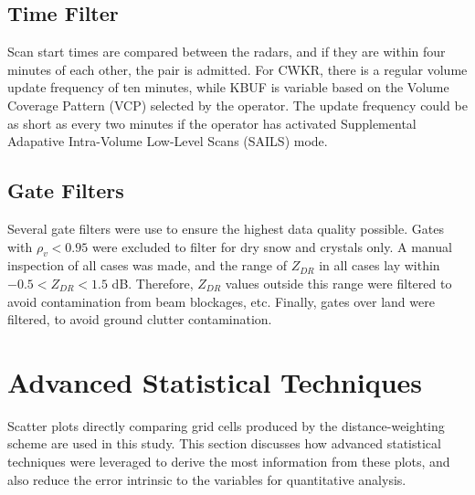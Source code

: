 \subsection{Time Filter}
Scan start times are compared between the radars, and if they are within four minutes of each other, the pair is admitted. For CWKR, there is a regular
volume update frequency of ten minutes, while KBUF is variable based on the Volume Coverage Pattern (VCP) selected by the operator. The update frequency
could be as short as every two minutes if the operator has activated Supplemental Adapative Intra-Volume Low-Level Scans (SAILS) mode.
\subsection{Gate Filters}
Several gate filters were use to ensure the highest data quality possible. Gates with $\rho_{v} < 0.95$ were excluded to filter for dry snow and crystals
only. A manual inspection of all cases was made, and the range of $Z_{DR}$ in all cases lay within $-0.5 < Z_{DR} < 1.5$ dB. Therefore, $Z_{DR}$ values
outside this range were filtered to avoid contamination from beam blockages, etc. Finally, gates over land were filtered, to avoid ground clutter
contamination.
\section{Advanced Statistical Techniques}
Scatter plots directly comparing grid cells produced by the distance-weighting scheme are used in this study. This section discusses how advanced statistical
techniques were leveraged to derive the most information from these plots, and also reduce the error intrinsic to the variables for quantitative analysis.
